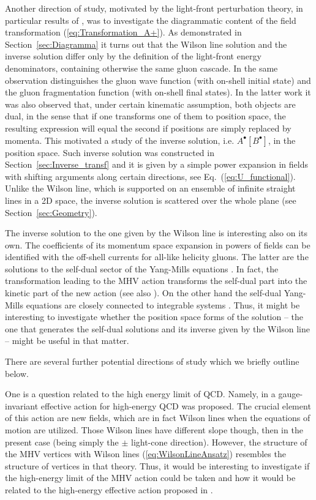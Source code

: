 \documentclass[english,american]{article}
\begin{document}
Another direction of study, motivated by the light-front perturbation
theory, in particular results of \citep{Motyka2009}, was to investigate the diagrammatic content of the field transformation (\ref{eq:Transformation_A+}).
As demonstrated in Section~\ref{sec:Diagramma}  it turns out that the Wilson line solution and the inverse solution differ only
by the definition of the light-front energy denominators, containing otherwise
the same gluon cascade. In \citep{Motyka2009}
the same observation distinguishes the gluon wave function (with on-shell initial state) and the
gluon fragmentation function (with on-shell final states). In the latter work it was also observed
that, under certain kinematic assumption, both objects are dual, in
the sense that if one transforms one of them to position space, the
resulting expression will equal the second if positions are simply
replaced by momenta. This motivated a study of the inverse solution,  i.e. $A^{\bullet}[B^{\bullet}]$,
 in the position space. Such inverse
solution was constructed in Section~\ref{sec:Inverse_transf} and it is given by a simple power expansion in fields with shifting arguments
along certain directions, see Eq.~(\ref{eq:U_functional}). Unlike
the Wilson line, which is supported on an ensemble of infinite straight lines in a 2D
space, the inverse solution is scattered over the whole plane (see Section~\ref{sec:Geometry}). 

The inverse solution to the one given by the Wilson line is interesting
also on its own. The coefficients of its momentum space expansion in powers of fields can be identified with the  off-shell
currents for all-like helicity gluons. The latter  are the solutions to the
self-dual sector of the Yang-Mills equations \citep{Bardeen1996}.
In fact, the transformation leading to the MHV action transforms the
self-dual part into the kinetic part of the new action (see also \citep{Gorsky2006}).
On the other hand the self-dual Yang-Mills equations are closely connected
to integrable systems \citep{Ablowitz1993}. Thus, it might be interesting
to investigate whether the position space forms of the solution --
the one that generates the self-dual solutions and its inverse given
by the Wilson line -- might be useful in that matter.

There are several further potential directions of study  which we briefly outline  below.

One is a question related to the high energy limit of QCD. Namely,
in \citep{Lipatov:1995pn} a gauge-invariant effective action for
high-energy QCD was proposed. The crucial element of this action are
new fields, which are in fact Wilson lines when the equations of motion
are utilized. Those Wilson lines have different slope though, then
in the present case (being simply the $\pm$ light-cone direction).
However, the structure of the MHV vertices with Wilson lines (\ref{eq:WilsonLineAnsatz})
resembles the structure of vertices in that theory. Thus, it would be interesting to investigate if the high-energy limit of the MHV action could be taken and how it would be related to the high-energy effective action proposed in \citep{Lipatov:1995pn}.
\end{document}
